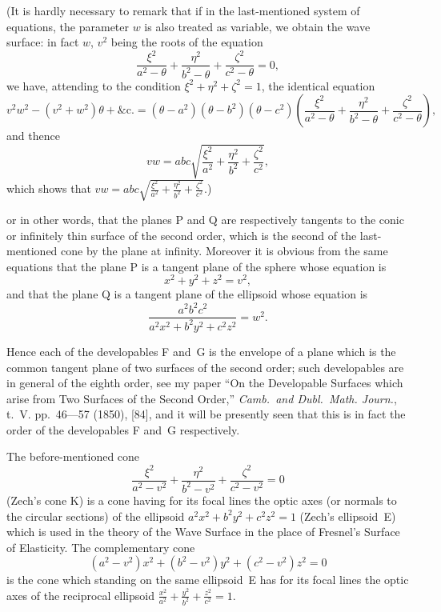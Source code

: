 \documentclass[11pt,a4paper]{book}
\begin{document}
(It is hardly necessary to remark that if in the last-mentioned system of
equations, the parameter $w$ is also treated as variable, we obtain the wave surface:
in fact $w$, $v^{2}$ being the roots of the equation
\[
\frac{\xi^{2}}{a^{2} - \theta} + \frac{\eta^{2}}{b^{2} - \theta} + \frac{\zeta^{2}}{c^{2} - \theta} = 0,
\]
we have, attending to the condition $\xi^{2} + \eta^{2} + \zeta^{2} = 1$, the identical equation
\[
v^{2}w^{2} - (v^{2} + w^{2})\theta + \&\mathrm{c}. =
(\theta - a^{2})(\theta - b^{2})(\theta - c^{2})
\left(\frac{\xi^{2}}{a^{2} - \theta} + \frac{\eta^{2}}{b^{2} - \theta} + \frac{\zeta^{2}}{c^{2} - \theta}\right),
\]
and thence
\[
vw = abc\sqrt{\frac{\xi^{2}}{a^{2}} + \frac{\eta^{2}}{b^{2}} + \frac{\zeta^{2}}{c^{2}}},
\]
which shows that $vw = abc\sqrt{\frac{\xi^{2}}{a^{2}} + \frac{\eta^{2}}{b^{2}} + \frac{\zeta^{2}}{c^{2}}}$.)

or in other words, that the planes P and Q are respectively tangents to the conic or
infinitely thin surface of the second order, which is the second of the last-mentioned
cone by the plane at infinity. Moreover it is obvious from the same equations that
the plane P is a tangent plane of the sphere whose equation is
\[
x^{2} + y^{2} + z^{2} = v^{2},
\]
and that the plane Q is a tangent plane of the ellipsoid whose equation is
\[
\frac{a^{2}b^{2}c^{2}}{a^{2}x^{2} + b^{2}y^{2} + c^{2}z^{2}} = w^{2}.
\]

Hence each of the developables F and~G is the envelope of a plane which is the
common tangent plane of two surfaces of the second order; such developables are in
general of the eighth order, see my paper ``On the Developable Surfaces which arise
from Two Surfaces of the Second Order,'' \textit{Camb.\ and Dubl.\ Math.
Journ.}, t.~V. pp.~46---57 (1850), [84], and it will be presently seen that this is in
fact the order of the developables F and~G respectively.

The before-mentioned cone
\[
\frac{\xi^{2}}{a^{2} - v^{2}} + \frac{\eta^{2}}{b^{2} - v^{2}} + \frac{\zeta^{2}}{c^{2} - v^{2}} = 0
\]
(Zech's cone K) is a cone having for its focal lines the optic axes (or normals to
the circular sections) of the ellipsoid $a^{2}x^{2} + b^{2}y^{2} + c^{2}z^{2} = 1$ (Zech's ellipsoid~E)
which is used in the theory of the Wave Surface in the place of Fresnel's Surface
of Elasticity. The complementary cone
\[
(a^{2} - v^{2})x^{2} + (b^{2} - v^{2})y^{2} + (c^{2} - v^{2})z^{2} = 0
\]
is the cone which standing on the same ellipsoid~E has for its focal lines the optic
axes of the reciprocal ellipsoid $\frac{x^{2}}{a^{2}} + \frac{y^{2}}{b^{2}} + \frac{z^{2}}{c^{2}} = 1$.
\end{document}
